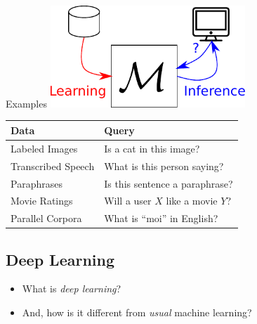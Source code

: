 \documentclass{beamer}
\begin{document}
\begin{frame}{Examples}
    \centering
    \includegraphics[width=0.55\textwidth]{machinelearning.pdf}

    \vspace{3mm}
    \begin{center}
    { \small
    \begin{tabular}{l | l}
        Data & Query \\
        \hline
        \hline
        Labeled Images &
        Is a cat in this image?  \\
        Transcribed Speech &
        What is this person saying?  \\
        Paraphrases &
        Is this sentence a paraphrase? \\
        Movie Ratings & 
        Will a user $X$ like a movie $Y$? \\
        Parallel Corpora &
        What is ``moi'' in English?  
    \end{tabular}
    }
\end{center}
\end{frame}

\subsection{Deep Learning}

\begin{frame}
\begin{itemize}
\item[] What is \emph{deep learning}? 
       \item[]  And, how is it different from \emph{usual} machine learning?
         \end{itemize}
\end{frame}
\end{document}
